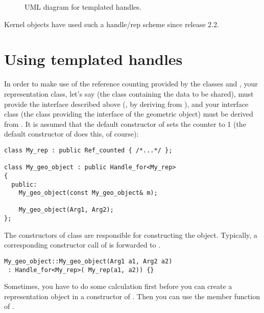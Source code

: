 \begin{figure}[ht]
\caption{UML diagram for templated handles.\label{fig:HandleFor}}
\end{figure}

Kernel objects have used such a handle/rep scheme since release 2.2. 

\section{Using templated handles}
In order to make use of the reference counting provided by the
classes  and , your representation class, 
let's say  (the class containing the data to be shared), 
must provide the interface described above (\eg, by deriving 
from ), and your interface class (the class providing
the interface of the geometric object) must be derived from 
. It is assumed that the default constructor of
 sets the counter to 1 (the default constructor of 
 does this, of course): 

\begin{verbatim}
class My_rep : public Ref_counted { /*...*/ };

class My_geo_object : public Handle_for<My_rep> 
{
  public:
    My_geo_object(const My_geo_object& m);

    My_geo_object(Arg1, Arg2);
};
\end{verbatim}

The constructors of class  are responsible for constructing
the  object. 
Typically, a corresponding constructor call of  is forwarded 
to .

\begin{verbatim}
My_geo_object::My_geo_object(Arg1 a1, Arg2 a2)
 : Handle_for<My_rep>( My_rep(a1, a2)) {}
\end{verbatim}

Sometimes, you have to do some calculation first before you can
create a representation object in a constructor of .
\def\ccIndexClassName{Handle_for}
Then you can use the %
 member function
of . 

